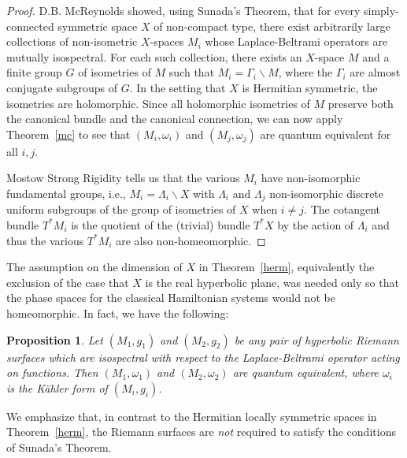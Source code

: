 \documentclass[12pt,leqno]{amsart}%
\newtheorem{prop}[theorem]{Proposition}
\theoremstyle{definition}
\theoremstyle{remark}
\numberwithin{equation}{section}
\begin{document}
\begin{proof}
D.B. McReynolds \cite{Mcr} showed, using Sunada's Theorem, that for every
simp\-ly-con\-nected symmetric space $X$ of non-compact type, there exist
arbitrarily large collections of non-isometric $X$-spaces $M_{i}$ whose
Laplace-Beltrami operators are mutually isospectral. For each such collection,
there exists an $X$-space $M$ and a finite group $G$ of isometries of $M$ such
that $M_{i}={{\Gamma}_{i}{\backslash}M}$, where the ${\Gamma}_{i}$ are almost
conjugate subgroups of $G$. In the setting that $X$ is Hermitian symmetric, the
isometries are holomorphic. Since all holomorphic isometries of $M$ preserve
both the canonical bundle and the canonical connection, we can now apply
Theorem~\ref{mc} to see that $(M_{i},\omega_{i})$ and $(M_{j},\omega_{j})$
are quantum equivalent for all $i,j$.

Mostow Strong Rigidity tells us that the various $M_{i}$ have non-isomorphic
fundamental groups, i.e., $M_{i}=\Lambda_{i}{\backslash}X$ with $\Lambda_{i}$
and $\Lambda_{j}$ non-isomorphic discrete uniform subgroups of the group of
isometries of $X$ when $i\neq j$. The cotangent bundle $T^{\ast}M_{i}$ is the
quotient of the (trivial) bundle $T^{\ast}X$ by the action of $\Lambda_{i}$ and
thus the various $T^{\ast}M_{i}$ are also non-homeomorphic.
\end{proof}

The assumption on the dimension of $X$ in Theorem~\ref{herm}, equivalently the
exclusion of the case that $X$ is the real hyperbolic plane, was needed only so
that the phase spaces for the classical Hamiltonian systems would not be
homeomorphic.  In fact, we have the following:

\begin{prop} Let $(M_1,g_1)$ and $(M_2,g_2)$ be \emph{any} pair of
hyperbolic Riemann surfaces which are iso\-spec\-tral with respect to the
Laplace-Beltrami operator acting on functions.
Then $(M_1,\omega_1)$ and $(M_2,\omega_2)$ are quantum
equivalent, where $\omega_i$ is the K\"ahler form of
$(M_i,g_i)$.
\end{prop}

We emphasize that, in contrast to the Hermitian locally symmetric spaces in
Theorem~\ref{herm}, the Riemann surfaces are \emph{not} required to satisfy the
conditions of Sunada's Theorem.
\end{document}
